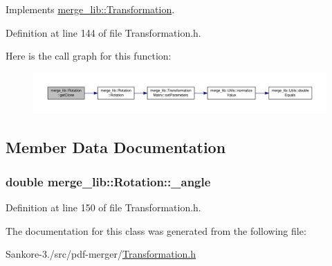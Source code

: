 Implements \hyperlink{classmerge__lib_1_1_transformation_a7ebaa86d0aa408c14090ebf4289d99eb}{merge\-\_\-lib\-::\-Transformation}.



Definition at line 144 of file Transformation.\-h.



Here is the call graph for this function\-:
\nopagebreak
\begin{figure}[H]
\begin{center}
\leavevmode
\includegraphics[width=350pt]{d3/d47/classmerge__lib_1_1_rotation_a6ccd72898a7f4bf6f17a7595df915180_cgraph}
\end{center}
\end{figure}




\subsection{Member Data Documentation}
\hypertarget{classmerge__lib_1_1_rotation_a1f38d8f1d891ca9ed2291645342674f2}{
\subsubsection[{\-\_\-angle}]{\setlength{\rightskip}{0pt plus 5cm}double merge\-\_\-lib\-::\-Rotation\-::\-\_\-angle\hspace{0.3cm}{\ttfamily [protected]}}}\label{d3/d47/classmerge__lib_1_1_rotation_a1f38d8f1d891ca9ed2291645342674f2}


Definition at line 150 of file Transformation.\-h.



The documentation for this class was generated from the following file\-:\begin{DoxyCompactItemize}
\item 
Sankore-\/3./src/pdf-\/merger/\hyperlink{_transformation_8h}{Transformation.\-h}\end{DoxyCompactItemize}
